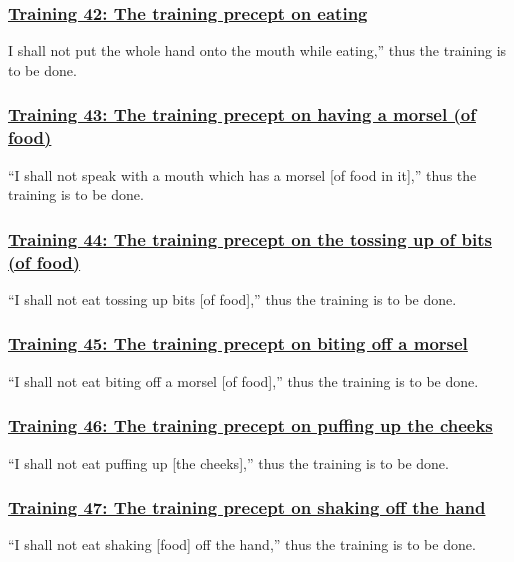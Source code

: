 \subsubsection*{\hyperref[sekh42]{Training 42: The training precept on eating}}
\label{training42}
I shall not put the whole hand onto the mouth while eating,'' thus the training is to be done.



\subsubsection*{\hyperref[sekh43]{Training 43: The training precept on having a morsel (of food)}}
\label{training43}
``I shall not speak with a mouth which has a morsel [of food in it],'' thus the training is to be done.



\subsubsection*{\hyperref[sekh44]{Training 44: The training precept on the tossing up of bits (of food)}}
\label{training44}
``I shall not eat tossing up bits [of food],'' thus the training is to be done.



\subsubsection*{\hyperref[sekh45]{Training 45: The training precept on biting off a morsel}}
\label{training45}
``I shall not eat biting off a morsel [of food],'' thus the training is to be done.



\subsubsection*{\hyperref[sekh46]{Training 46: The training precept on puffing up the cheeks}}
\label{training46}
``I shall not eat puffing up [the cheeks],'' thus the training is to be done.



\subsubsection*{\hyperref[sekh47]{Training 47: The training precept on shaking off the hand}}
\label{training47}
``I shall not eat shaking [food] off the hand,'' thus the training is to be done.



